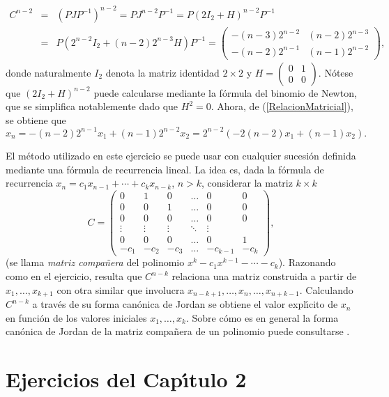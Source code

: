\begin{solution}
\begin{eqnarray*}C^{n-2}&=&(PJP^{-1})^{n-2}=PJ^{n-2}P^{-1}=P(2I_2+H)^{n-2}P^{-1}\\&=&
P(2^{n-2}I_2+(n-2)2^{n-3}H)P^{-1}=
\begin{pmatrix}
-(n-3)2^{n-2} & (n-2)2^{n-3}\\ -(n-2)2^{n-1} & (n-1)2^{n-2}\end{pmatrix},\end{eqnarray*}
donde naturalmente $I_2$ denota la matriz identidad $2\times 2$ y $H=\begin{pmatrix}0&1\\ 0&0\end{pmatrix}$. N\'otese que $(2I_2+H)^{n-2}$ puede calcularse mediante la f\'ormula del binomio de Newton, que se simplifica notablemente dado que $H^2=0$.
Ahora, de (\ref{RelacionMatricial}), se obtiene que
$$x_n=-(n-2)2^{n-1}x_1+(n-1)2^{n-2}x_2=2^{n-2}(-2(n-2)x_1+(n-1)x_2).$$
\end{solution}
\begin{remark*} El m\'etodo utilizado en este ejercicio se puede usar con cualquier sucesi\'on definida mediante una f\'ormula de recurrencia lineal. La idea es, dada la f\'ormula de recurrencia $x_n=c_1x_{n-1}+\cdots +c_kx_{n-k}$, $n>k$, considerar la matriz $k\times k$
$$C=\begin{pmatrix}
0&1&0&\dots & 0 &0\\
0&0&1&\dots & 0&0\\
0&0&0&\dots & 0&0\\
\vdots&\vdots&\vdots&\ddots&\vdots\\
0&0&0&\dots&0&1\\
-c_1&-c_2&-c_3&\dots &-c_{k-1}&-c_k
\end{pmatrix},$$
(se llama \emph{matriz compa\~nera} del polinomio $x^k-c_1x^{k-1}-\cdots -c_k$). Razonando como en el ejercicio, resulta que $C^{n-k}$ relaciona una matriz construida a partir de $x_1,\dots ,x_{k+1}$ con otra similar que involucra $x_{n-k+1},\dots ,x_n,\dots,x_{n+k-1}$. Calculando $C^{n-k}$ a trav\'es de su forma can\'onica de Jordan se obtiene el valor expl\'\i cito de $x_n$ en funci\'on de los valores iniciales $x_1,\dots,x_k$. Sobre c\'omo es en general la forma can\'onica de Jordan de la matriz compa\~nera de un polinomio puede consultarse \cite[Teorema 4.3, Corolario 4.4]{Hungerford}.
\end{remark*}

\section{Ejercicios del Cap\'\i tulo 2}

